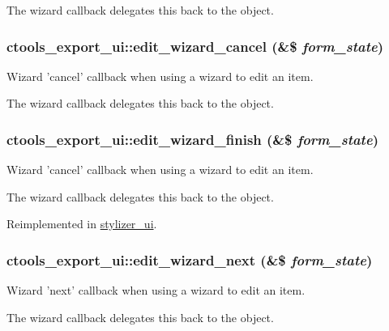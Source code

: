 The wizard callback delegates this back to the object. \hypertarget{classctools__export__ui_adbc6c75b9c635e07f1ef82b0ba25e932}{
\subsubsection[{edit\_\-wizard\_\-cancel}]{\setlength{\rightskip}{0pt plus 5cm}ctools\_\-export\_\-ui::edit\_\-wizard\_\-cancel (\&\$ {\em form\_\-state})}}
\label{classctools__export__ui_adbc6c75b9c635e07f1ef82b0ba25e932}
Wizard 'cancel' callback when using a wizard to edit an item.

The wizard callback delegates this back to the object. \hypertarget{classctools__export__ui_a997d5570604880f989d5aaebd2f6fe29}{
\subsubsection[{edit\_\-wizard\_\-finish}]{\setlength{\rightskip}{0pt plus 5cm}ctools\_\-export\_\-ui::edit\_\-wizard\_\-finish (\&\$ {\em form\_\-state})}}
\label{classctools__export__ui_a997d5570604880f989d5aaebd2f6fe29}
Wizard 'cancel' callback when using a wizard to edit an item.

The wizard callback delegates this back to the object. 

Reimplemented in \hyperlink{classstylizer__ui_a1427eae1e6f77718b123dc9d74f335c2}{stylizer\_\-ui}.\hypertarget{classctools__export__ui_abe09a0604f2423fbb210e09b0e6273bd}{
\subsubsection[{edit\_\-wizard\_\-next}]{\setlength{\rightskip}{0pt plus 5cm}ctools\_\-export\_\-ui::edit\_\-wizard\_\-next (\&\$ {\em form\_\-state})}}
\label{classctools__export__ui_abe09a0604f2423fbb210e09b0e6273bd}
Wizard 'next' callback when using a wizard to edit an item.

The wizard callback delegates this back to the object. 

